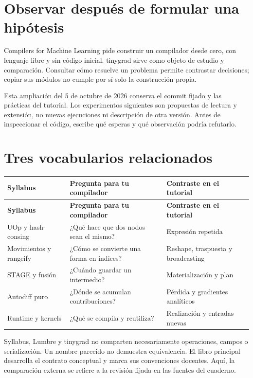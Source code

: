 \documentclass[12pt,a4paper,oneside]{report}
\begin{document}
\section{Observar después de formular una hipótesis}
Compilers for Machine Learning pide construir un compilador desde cero, con lenguaje libre y sin código inicial. tinygrad sirve como objeto de estudio y comparación. Consultar cómo resuelve un problema permite contrastar decisiones; copiar sus módulos no cumple por sí solo la construcción propia.

Esta ampliación del 5 de octubre de 2026 conserva el commit fijado y las prácticas del tutorial. Los experimentos siguientes son propuestas de lectura y extensión, no nuevas ejecuciones ni descripción de otra versión. Antes de inspeccionar el código, escribe qué esperas y qué observación podría refutarlo.

\section{Tres vocabularios relacionados}
{\small
\begin{longtable}{@{}P{0.28\textwidth}P{0.32\textwidth}P{0.34\textwidth}@{}}
\toprule
\textbf{Syllabus} & \textbf{Pregunta para tu compilador} & \textbf{Contraste en el tutorial}\\
\midrule
\endfirsthead
\toprule
\textbf{Syllabus} & \textbf{Pregunta para tu compilador} & \textbf{Contraste en el tutorial}\\
\midrule
\endhead
UOp y hash-consing & ¿Qué hace que dos nodos sean el mismo? & Expresión repetida\\
Movimientos y rangeify & ¿Cómo se convierte una forma en índices? & Reshape, traspuesta y broadcasting\\
STAGE y fusión & ¿Cuándo guardar un intermedio? & Materialización y plan\\
Autodiff puro & ¿Dónde se acumulan contribuciones? & Pérdida y gradientes analíticos\\
Runtime y kernels & ¿Qué se compila y reutiliza? & Realización y entradas nuevas\\
\bottomrule
\end{longtable}
}
Syllabus, Lumbre y tinygrad no comparten necesariamente operaciones, campos o serialización. Un nombre parecido no demuestra equivalencia. El libro principal desarrolla el contrato conceptual y marca sus convenciones docentes. Aquí, la comparación externa se refiere a la revisión fijada en las fuentes del cuaderno.
\end{document}
